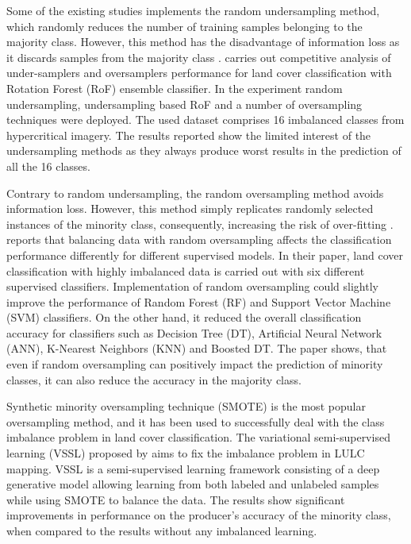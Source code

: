 \documentclass[parskip=full]{scrartcl}
\begin{document}
Some of the existing studies implements the random undersampling method, which
randomly reduces the number of training samples  belonging to the majority
class. However, this method has the disadvantage of information loss as it
discards samples from the majority class  \cite{Feng2019}. \cite{Feng2018}
carries out competitive analysis of  under-samplers and oversamplers performance
for land cover classification with  Rotation Forest (RoF) ensemble classifier.
In the experiment random  undersampling, undersampling based RoF and a number of
oversampling techniques  were deployed. The used dataset comprises 16 imbalanced
classes from  hypercritical imagery. The results reported show the limited
interest of the  undersampling methods as they always produce worst results in
the prediction of all the 16 classes.

Contrary to random undersampling, the random oversampling method avoids
information loss. However, this method simply replicates randomly selected
instances of the minority class, consequently, increasing the risk of
over-fitting \cite{Krawczyk2016}. \cite{Maxwell2018} reports that balancing data
with random oversampling affects the classification performance differently for
different supervised models. In their paper, land cover classification with
highly imbalanced data is carried out with six different supervised classifiers.
Implementation of random oversampling could slightly improve the performance of
Random Forest (RF) and Support Vector Machine (SVM) classifiers. On the other
hand, it reduced the overall classification accuracy for classifiers such as
Decision Tree (DT), Artificial Neural Network (ANN), K-Nearest Neighbors (KNN)
and Boosted DT. The paper shows, that even if random oversampling can positively
impact the prediction of minority classes, it can also reduce the accuracy in
the majority class.

Synthetic minority oversampling technique (SMOTE) \cite{Chawla2002} is the most
popular oversampling method, and it has been used to successfully deal with the
class imbalance problem in land cover classification. The variational
semi-supervised learning (VSSL) proposed by \cite{Cenggoro2018} aims to fix the
imbalance problem in LULC mapping. VSSL is a semi-supervised learning framework
consisting of a deep generative model allowing learning from both labeled and
unlabeled samples while using SMOTE to balance the data. The results show
significant improvements in performance on the producer’s accuracy of the
minority class, when compared to the results without any imbalanced learning.
\end{document}

